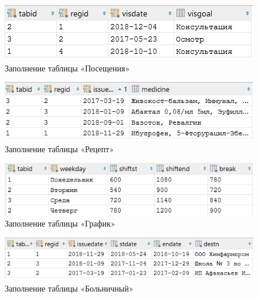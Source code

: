 \documentclass[14pt,a4paper,russian]{extreport}
\begin{document}
\vspace{0.00mm}

\begin{figure}[h!]
        \center\includegraphics[scale=1]{visit}
        \caption{Заполнение таблицы «Посещения»}
        \label{fig:visit}
\end{figure}

\vspace{0.00mm}

\begin{figure}[h]
        \center\includegraphics[scale=1]{ireceipt}
        \caption{Заполнение таблицы «Рецепт»}
        \label{fig:ireceipt}
\end{figure}

\vspace{0.00mm}

\begin{figure}[h]
        \center\includegraphics[scale=1]{itimetable}
        \caption{Заполнение таблицы «График»}
        \label{fig:itimetable}
\end{figure}

\vspace{0.00mm}

\begin{figure}[h]
        \center\includegraphics[scale=1]{sickleave}
        \caption{Заполнение таблицы «Больничный»}
        \label{fig:sickleave}
\end{figure}
\end{document}
